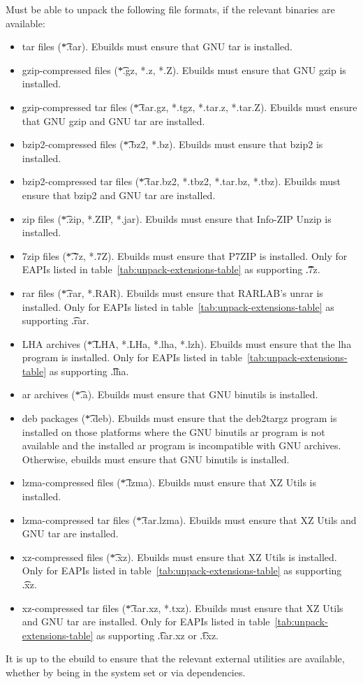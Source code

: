\begin{description}
     Must be able to unpack the following file formats, if the
    relevant binaries are available:
    \begin{itemize}
    \item tar files (\t{*.tar}). Ebuilds must ensure that GNU tar is installed.
    \item gzip-compressed files (\t{*.gz, *.z, *.Z}). Ebuilds must ensure that GNU gzip is
        installed.
    \item gzip-compressed tar files (\t{*.tar.gz, *.tgz, *.tar.z, *.tar.Z}). Ebuilds must ensure
        that GNU gzip and GNU tar are installed.
    \item bzip2-compressed files (\t{*.bz2, *.bz}). Ebuilds must ensure that bzip2 is installed.
    \item bzip2-compressed tar files (\t{*.tar.bz2, *.tbz2, *.tar.bz, *.tbz}). Ebuilds must ensure
        that bzip2 and GNU tar are installed.
    \item zip files (\t{*.zip, *.ZIP, *.jar}). Ebuilds must ensure that Info-ZIP Unzip is installed.
    \item 7zip files (\t{*.7z, *.7Z}). Ebuilds must ensure that P7ZIP is installed. Only for EAPIs
        listed in table~\ref{tab:unpack-extensions-table} as supporting \t{.7z}.
    \item rar files (\t{*.rar, *.RAR}). Ebuilds must ensure that RARLAB's unrar is installed.
        Only for EAPIs listed in table~\ref{tab:unpack-extensions-table} as supporting \t{.rar}.
    \item LHA archives (\t{*.LHA, *.LHa, *.lha, *.lzh}). Ebuilds must ensure that the lha program is
        installed. Only for EAPIs listed in table~\ref{tab:unpack-extensions-table} as supporting
        \t{.lha}.
    \item ar archives (\t{*.a}). Ebuilds must ensure that GNU binutils is installed.
    \item deb packages (\t{*.deb}). Ebuilds must ensure that the deb2targz program is installed on
        those platforms where the GNU binutils ar program is not available and the installed ar
        program is incompatible with GNU archives. Otherwise, ebuilds must ensure that GNU binutils
        is installed.
    \item lzma-compressed files (\t{*.lzma}). Ebuilds must ensure that XZ Utils is installed.
    \item lzma-compressed tar files (\t{*.tar.lzma}). Ebuilds must ensure that XZ Utils and GNU tar
        are installed.
    \item xz-compressed files (\t{*.xz}). Ebuilds must ensure that XZ Utils is installed. Only for
        EAPIs listed in table~\ref{tab:unpack-extensions-table} as supporting \t{.xz}.
    \item xz-compressed tar files (\t{*.tar.xz, *.txz}). Ebuilds must ensure that XZ Utils and
        GNU tar are installed. Only for EAPIs listed in table~\ref{tab:unpack-extensions-table} as
        supporting \t{.tar.xz} or \t{.txz}.
    \end{itemize}
    It is up to the ebuild to ensure that the relevant external utilities are available, whether by
    being in the system set or via dependencies.


\end{description}
